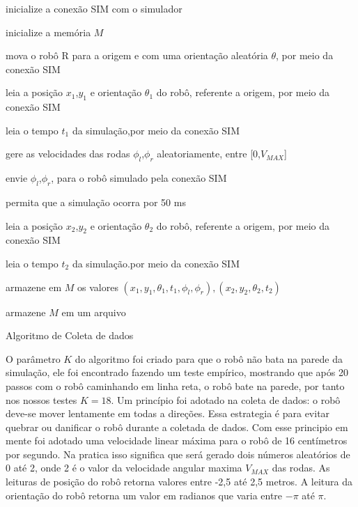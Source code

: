 \begin{algorithm}[H]
    \label{coleta:de:dados:}
    
    
    inicialize a conexão SIM  com o simulador

    inicialize a memória $M$

    mova o robô R para a origem e com uma orientação aleatória $\theta$,
    por meio da conexão SIM

     {
        leia a posição $x_1$,$y_1$  e orientação $\theta_{1}$ do robô,
        referente a origem, por meio da conexão SIM
        
        leia o tempo $t_1$ da simulação,por meio da conexão SIM
        
        gere as velocidades das rodas $\phi_l$,$\phi_r$ aleatoriamente,
        entre [0,$V_{MAX}$]
        
        envie  $\phi_l$,$\phi_r$, para o robô simulado pela conexão SIM

        permita que a simulação ocorra por 50 ms 

        leia a posição $x_2$,$y_2$  e orientação $\theta_{2}$ do robô,
        referente a origem, por meio da conexão SIM

        leia o tempo $t_2$ da simulação.por meio da conexão SIM

        
        armazene em $M$ os valores  $(x_1,y_1,\theta_{1},t_1,\phi_l,\phi_r),(x_2,y_2,\theta_{2},t_2)$
        
    }

    armazene $M$ em um arquivo
    
    \caption{Algoritmo de Coleta de dados}
    
\end{algorithm}

O parâmetro $K$ do algoritmo foi criado para que o robô não bata na parede
da simulação, ele foi encontrado fazendo um teste empírico, mostrando que
após 20 passos  com o robô caminhando em linha reta, o robô bate na parede,
por tanto nos nossos testes $K = 18$. Um princípio foi adotado na coleta
de dados: o robô deve-se mover lentamente em todas a direções.
Essa estrategia é para evitar quebrar ou danificar o robô durante a coletada
de dados. Com esse principio em mente foi adotado uma velocidade linear
máxima para o robô de 16 centímetros por segundo. Na pratica isso significa
que será gerado dois números aleatórios de 0 até 2,
onde 2 é o valor da velocidade angular maxima $V_{MAX}$ das rodas.
As leituras de posição do robô retorna valores entre 
-2,5 até 2,5 metros.
A leitura da orientação do robô retorna um valor em radianos que varia entre
$-\pi$ até $\pi$.


